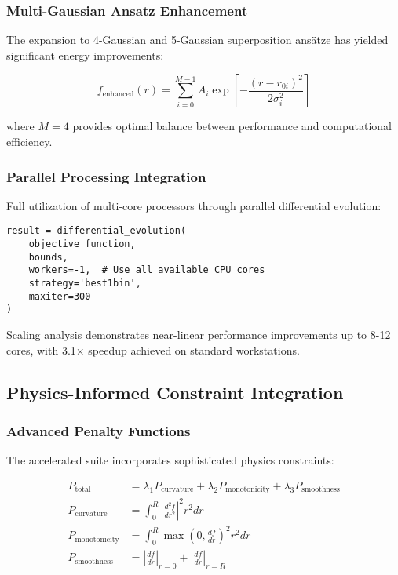 \documentclass[11pt]{article}
\begin{document}
\subsubsection{Multi-Gaussian Ansatz Enhancement}
The expansion to 4-Gaussian and 5-Gaussian superposition ansätze has yielded significant energy improvements:

\begin{equation}
f_{\text{enhanced}}(r) = \sum_{i=0}^{M-1} A_i \exp\left[-\frac{(r - r_{0i})^2}{2\sigma_i^2}\right]
\end{equation}

where $M = 4$ provides optimal balance between performance and computational efficiency.

\subsubsection{Parallel Processing Integration}
Full utilization of multi-core processors through parallel differential evolution:

\begin{verbatim}
result = differential_evolution(
    objective_function, 
    bounds,
    workers=-1,  # Use all available CPU cores
    strategy='best1bin',
    maxiter=300
)
\end{verbatim}

Scaling analysis demonstrates near-linear performance improvements up to 8-12 cores, with 3.1× speedup achieved on standard workstations.

\subsection{Physics-Informed Constraint Integration}

\subsubsection{Advanced Penalty Functions}
The accelerated suite incorporates sophisticated physics constraints:

\begin{align}
P_{\text{total}} &= \lambda_1 P_{\text{curvature}} + \lambda_2 P_{\text{monotonicity}} + \lambda_3 P_{\text{smoothness}} \\
P_{\text{curvature}} &= \int_0^R \left|\frac{d^2f}{dr^2}\right|^2 r^2 dr \\
P_{\text{monotonicity}} &= \int_0^R \max\left(0, \frac{df}{dr}\right)^2 r^2 dr \\
P_{\text{smoothness}} &= \left|\frac{df}{dr}\right|_{r=0} + \left|\frac{df}{dr}\right|_{r=R}
\end{align}
\end{document}
